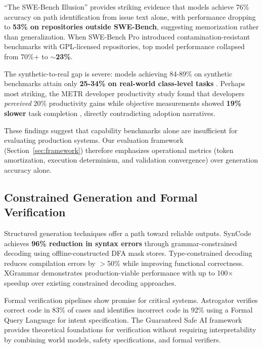 \documentclass[11pt]{article}
\begin{document}
``The SWE-Bench Illusion'' \citep{shi2025swebenchillusion} provides striking evidence that models achieve 76\% accuracy on path identification from issue text alone, with performance dropping to \textbf{53\% on repositories outside SWE-Bench}, suggesting memorization rather than generalization. When SWE-Bench Pro introduced contamination-resistant benchmarks with GPL-licensed repositories, top model performance collapsed from 70\%+ to \textbf{$\sim$23\%}.

The synthetic-to-real gap is severe: models achieving 84-89\% on synthetic benchmarks attain only \textbf{25-34\% on real-world class-level tasks} \citep{rao2025synthetic}. Perhaps most striking, the METR developer productivity study found that developers \emph{perceived} 20\% productivity gains while objective measurements showed \textbf{19\% slower} task completion \citep{metr2025productivity}, directly contradicting adoption narratives.

These findings suggest that capability benchmarks alone are insufficient for evaluating production systems. Our evaluation framework (Section~\ref{sec:framework}) therefore emphasizes operational metrics (token amortization, execution determinism, and validation convergence) over generation accuracy alone.

\subsection{Constrained Generation and Formal Verification}

Structured generation techniques offer a path toward reliable outputs. SynCode \citep{ugare2024syncode} achieves \textbf{96\% reduction in syntax errors} through grammar-constrained decoding using offline-constructed DFA mask stores. Type-constrained decoding \citep{mundler2025typeconstrained} reduces compilation errors by $>$50\% while improving functional correctness. XGrammar \citep{dong2024xgrammar} demonstrates production-viable performance with up to 100$\times$ speedup over existing constrained decoding approaches.

Formal verification pipelines show promise for critical systems. Astrogator \citep{councilman2025astrogator} verifies correct code in 83\% of cases and identifies incorrect code in 92\% using a Formal Query Language for intent specification. The Guaranteed Safe AI framework \citep{dalrymple2024guaranteed} provides theoretical foundations for verification without requiring interpretability by combining world models, safety specifications, and formal verifiers.
\end{document}
